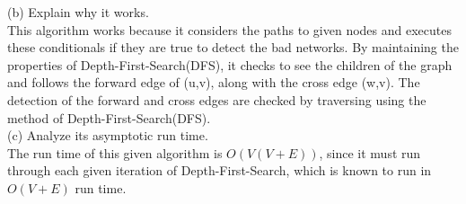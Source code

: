 \documentclass[12pt]{article}
\begin{document}
(b) Explain why it works. \\
\linebreak
This algorithm works because it considers the paths to given nodes and executes these conditionals if they are true to detect the bad networks. By maintaining the properties of Depth-First-Search(DFS), it checks to see the children of the graph and follows the forward edge of (u,v), along with the cross edge (w,v). The detection of the forward and cross edges are checked by traversing using the method of Depth-First-Search(DFS).  \\
\linebreak
(c) Analyze its asymptotic run time. \\
\linebreak
The run time of this given algorithm is $O(V(V+E))$, since it must run through each given iteration of Depth-First-Search, which is known to run in $O(V+E)$ run time. \\
\end{document}

